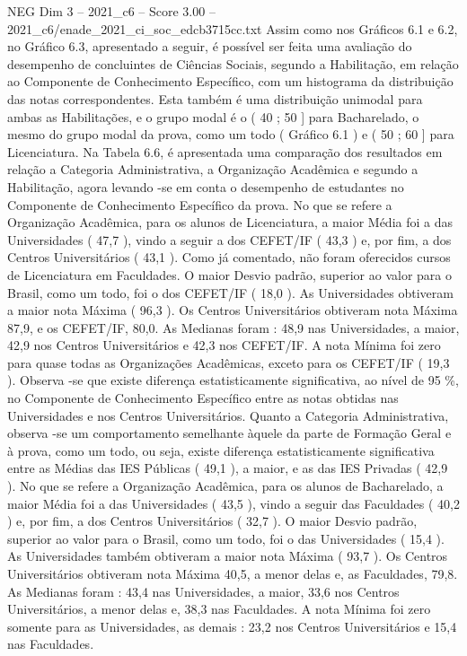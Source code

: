 \begin{textsample}{NEG Dim 3 – 2021\_c6 – Score 3.00 – 2021\_c6/enade\_2021\_ci\_soc\_edcb3715cc.txt}
Assim como nos Gráficos 6.1 e 6.2, no Gráfico 6.3, apresentado a seguir, é possível ser feita uma avaliação do desempenho de concluintes de Ciências Sociais, segundo a Habilitação, em relação ao Componente de Conhecimento Específico, com um histograma da distribuição das notas correspondentes.
Esta também é uma distribuição unimodal para ambas as Habilitações, e o grupo modal é o ( 40 ; 50 ] para Bacharelado, o mesmo do grupo modal da prova, como um todo ( Gráfico 6.1 ) e ( 50 ; 60 ] para Licenciatura.
Na Tabela 6.6, é apresentada uma comparação dos resultados em relação a Categoria Administrativa, a Organização Acadêmica e segundo a Habilitação, agora levando -se em conta o desempenho de estudantes no Componente de Conhecimento Específico da prova.
No que se refere a Organização Acadêmica, para os alunos de Licenciatura, a maior Média foi a das Universidades ( 47,7 ), vindo a seguir a dos CEFET/IF ( 43,3 ) e, por fim, a dos Centros Universitários ( 43,1 ).
Como já comentado, não foram oferecidos cursos de Licenciatura em Faculdades.
O maior Desvio padrão, superior ao valor para o Brasil, como um todo, foi o dos CEFET/IF ( 18,0 ).
As Universidades obtiveram a maior nota Máxima ( 96,3 ).
Os Centros Universitários obtiveram nota Máxima 87,9, e os CEFET/IF, 80,0.
As Medianas foram : 48,9 nas Universidades, a maior, 42,9 nos Centros Universitários e 42,3 nos CEFET/IF.
A nota Mínima foi zero para quase todas as Organizações Acadêmicas, exceto para os CEFET/IF ( 19,3 ).
Observa -se que existe diferença estatisticamente significativa, ao nível de 95 \%, no Componente de Conhecimento Específico entre as notas obtidas nas Universidades e nos Centros Universitários.
Quanto a Categoria Administrativa, observa -se um comportamento semelhante àquele da parte de Formação Geral e à prova, como um todo, ou seja, existe diferença estatisticamente significativa entre as Médias das IES Públicas ( 49,1 ), a maior, e as das IES Privadas ( 42,9 ).
No que se refere a Organização Acadêmica, para os alunos de Bacharelado, a maior Média foi a das Universidades ( 43,5 ), vindo a seguir das Faculdades ( 40,2 ) e, por fim, a dos Centros Universitários ( 32,7 ).
O maior Desvio padrão, superior ao valor para o Brasil, como um todo, foi o das Universidades ( 15,4 ).
As Universidades também obtiveram a maior nota Máxima ( 93,7 ).
Os Centros Universitários obtiveram nota Máxima 40,5, a menor delas e, as Faculdades, 79,8.
As Medianas foram : 43,4 nas Universidades, a maior, 33,6 nos Centros Universitários, a menor delas e, 38,3 nas Faculdades.
A nota Mínima foi zero somente para as Universidades, as demais : 23,2 nos Centros Universitários e 15,4 nas Faculdades.

\end{textsample}
